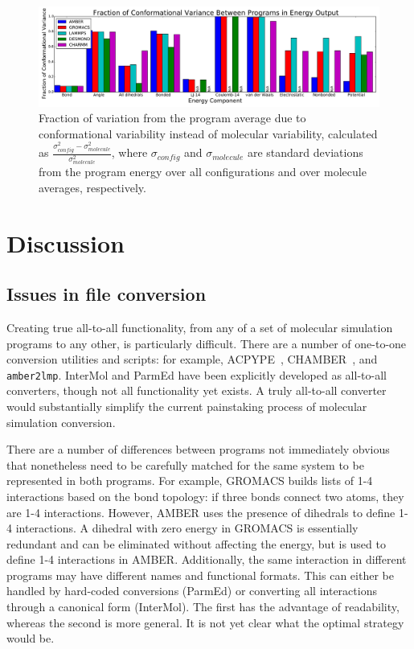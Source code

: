 \begin{figure}[h]
\includegraphics[width=\textwidth]{fractionofvariation.pdf}   
\caption{Fraction of variation from the program average due to
  conformational variability instead of molecular variability,
  calculated as
  $\frac{\sigma^2_{config}-\sigma^2_{molecule}}{\sigma^2_{molecule}}$,
  where $\sigma_{config}$ and $\sigma_{molecule}$ are standard
  deviations from the program energy over all configurations and over
  molecule averages, respectively.
\label{fig:confvariability}}
\end{figure}

\section*{Discussion}

\subsection*{Issues in file conversion}
Creating true all-to-all functionality, from any of a set of molecular
simulation programs to any other, is particularly difficult. There are
a number of one-to-one conversion utilities and scripts: for example,
ACPYPE~\citep{sousa_da_silva_acpype_2012},
CHAMBER~\citep{crowley_chamber:_2009}, and {\tt amber2lmp}.  InterMol
and ParmEd have been explicitly developed as all-to-all converters,
though not all functionality yet exists. A truly all-to-all converter
would substantially simplify the current painstaking process of
molecular simulation conversion.

There are a number of differences between programs not immediately
obvious that nonetheless need to be carefully matched for the same
system to be represented in both programs.  For example, GROMACS
builds lists of 1-4 interactions based on the bond topology: if three
bonds connect two atoms, they are 1-4 interactions. However, AMBER
uses the presence of dihedrals to define 1-4 interactions. A dihedral
with zero energy in GROMACS is essentially redundant and can be
eliminated without affecting the energy, but is used to define 1-4
interactions in AMBER.  Additionally, the same interaction in
different programs may have different names and functional
formats. This can either be handled by hard-coded conversions (ParmEd)
or converting all interactions through a canonical form (InterMol).  The
first has the advantage of readability, whereas the second is more
general.  It is not yet clear what the optimal strategy would be.


